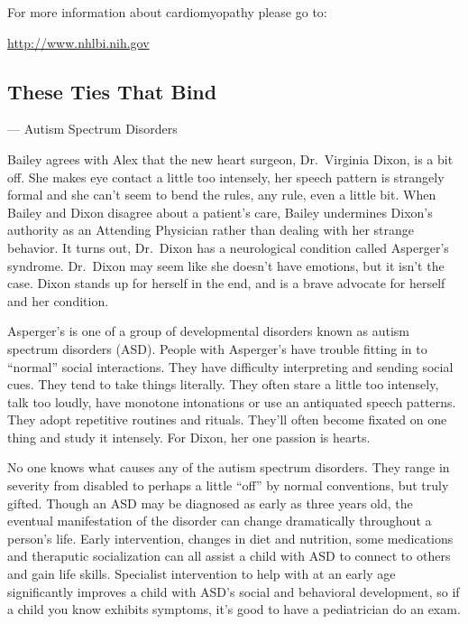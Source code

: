 \documentclass[12pt,a4paper,onecolumn]{article}
\begin{document}
For more information about cardiomyopathy please go to:

\url{http://www.nhlbi.nih.gov}

\subsection{These Ties That Bind}
\begin{flushright} --- Autism\cite{autism} Spectrum Disorders
\end{flushright}

Bailey agrees with Alex that the new heart surgeon, Dr.~Virginia Dixon, is a bit off. She makes eye
contact a little too intensely, her speech pattern is strangely formal and she can't seem to bend
the rules, any rule, even a little bit. When Bailey and Dixon disagree about a patient's care,
Bailey undermines Dixon's authority as an Attending Physician rather than dealing with her strange
behavior. It turns out, Dr.~Dixon has a neurological condition called Asperger's syndrome. Dr.~Dixon
may seem like she doesn't have emotions, but it isn't the case. Dixon stands up for herself in the
end, and is a brave advocate for herself and her condition.

Asperger's is one of a group of developmental disorders known as autism spectrum disorders (ASD).
People with Asperger's have trouble fitting in to ``normal'' social interactions. They have
difficulty interpreting and sending social cues. They tend to take things literally. They often
stare a little too intensely, talk too loudly, have monotone intonations\cite{intonation} or use an
antiquated speech patterns. They adopt repetitive routines and rituals. They'll often become fixated
on one thing and study it intensely. For Dixon, her one passion is hearts.

No one knows what causes any of the autism spectrum disorders. They range in severity from disabled
to perhaps a little ``off'' by normal conventions, but truly gifted. Though an ASD may be diagnosed
as early as three years old, the eventual manifestation\cite{manifestation} of the disorder can
change dramatically throughout a person's life. Early intervention, changes in diet and nutrition,
some medications and theraputic socialization can all assist a child with ASD to connect to others
and gain life skills. Specialist intervention to help with at an early age significantly improves a
child with ASD's social and behavioral development, so if a child you know exhibits symptoms, it's
good to have a pediatrician do an exam.
\end{document}
